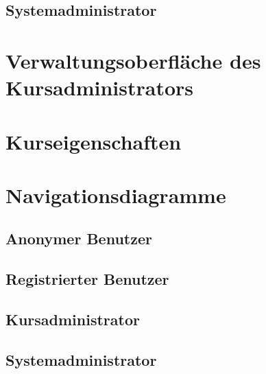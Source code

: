 \documentclass[a4paper]{scrreprt}
\begin{document}
        

    \subsection{Systemadministrator}
        
        
            
   
    
    \section{Verwaltungsoberfläche des Kursadministrators}
    
   
       
    
    \section{Kurseigenschaften}
    
    
       
    
    
    \section{Navigationsdiagramme}
        \subsection{Anonymer Benutzer}
            
            
            
        \subsection{Registrierter Benutzer}
             
            
            
        \subsection{Kursadministrator}
            
             
            
        \subsection{Systemadministrator}
           
            
            
            
         
\end{document}
